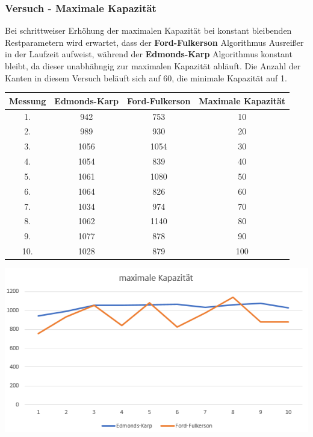 \documentclass[11pt]{article}
\begin{document}
    \subsubsection{Versuch - Maximale Kapazit\"at}
    Bei schrittweiser Erh\"ohung der maximalen Kapazit\"at bei konstant bleibenden Restparametern wird erwartet, dass der \textbf{Ford-Fulkerson} Algorithmus Ausrei\ss{}er in der Laufzeit aufweist, w\"ahrend der \textbf{Edmonds-Karp} Algorithmus konstant bleibt, da dieser unabh\"ahngig zur maximalen Kapazit\"at abl\"auft. Die Anzahl der Kanten in diesem Versuch bel\"auft sich auf 60, die minimale Kapazit\"at auf 1.

    \begin{center}
        \begin{tabular}{c|c|c|c}
            Messung & \textbf{Edmonds-Karp} & \textbf{Ford-Fulkerson} & Maximale Kapazit\"at\\
            \hline
            1. & 942 & 753 & 10\\
            2. & 989 & 930 & 20\\
            3. & 1056 & 1054 & 30\\
            4. & 1054 & 839 & 40\\
            5. & 1061 & 1080 & 50\\
            6. & 1064 & 826 & 60\\
            7. & 1034 & 974 & 70\\
            8. & 1062 & 1140 & 80\\
            9. & 1077 & 878 & 90\\
            10. & 1028 & 879 & 100\\
        \end{tabular}
    \end{center}

    \begin{center}
        \includegraphics[weight=10cm]{../max-capacity-graph.PNG}
    \end{center}
\end{document}
